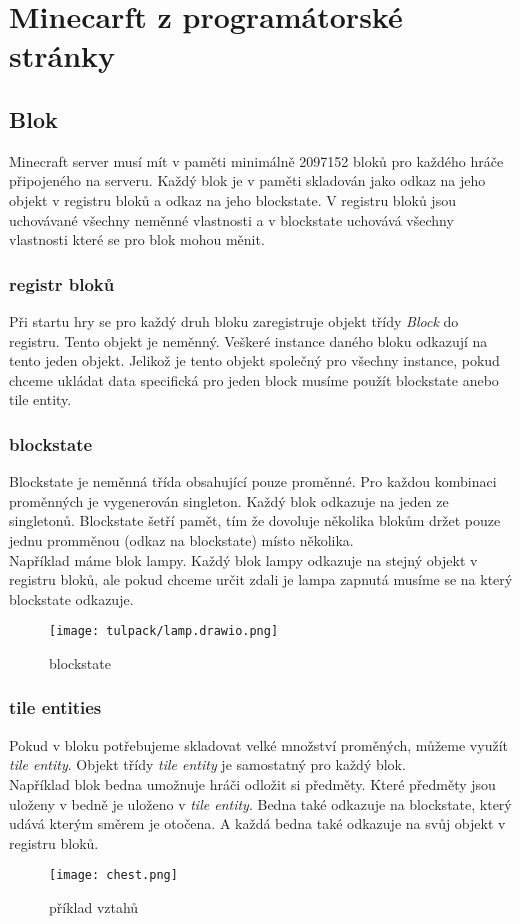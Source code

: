 \documentclass[FM,RP]{tulthesis}
\begin{document}
\chapter{Minecarft z programátorské stránky}
\section{Blok}
Minecraft server musí mít v paměti minimálně 2097152 bloků pro každého hráče připojeného na serveru. Každý blok je v paměti skladován jako odkaz na jeho objekt v registru bloků a odkaz na jeho blockstate. V registru bloků jsou uchovávané všechny neměnné vlastnosti a v blockstate uchovává všechny vlastnosti které se pro blok mohou měnit. 
\subsection{registr bloků}
Při startu hry se pro každý druh bloku zaregistruje objekt třídy \textit{Block} do registru. Tento objekt je neměnný. Veškeré instance daného bloku odkazují na tento jeden objekt. Jelikož je tento objekt společný pro všechny instance, pokud chceme ukládat data
specifická pro jeden block musíme použít blockstate anebo tile entity.
\subsection{blockstate}
Blockstate je neměnná třída obsahující pouze proměnné. Pro každou kombinaci proměnných je vygenerován singleton. Každý blok odkazuje na jeden ze singletonů. Blockstate šetří pamět, tím že dovoluje několika blokům držet pouze jednu promměnou (odkaz na blockstate) místo několika. \\Například máme blok lampy. Každý blok lampy odkazuje na stejný objekt v registru bloků, ale pokud chceme určit zdali je lampa zapnutá musíme se na který blockstate odkazuje.

\begin{figure}[h]
    \centering
    \texttt{[image: tulpack/lamp.drawio.png]}
    \caption{blockstate}
    \label{fig:blockstate}
\end{figure}

\subsection{tile entities}
Pokud v bloku potřebujeme skladovat velké množství proměných, můžeme využít \textit{tile entity}. Objekt třídy \textit{tile entity} je samostatný pro každý blok.\\
Například blok bedna umožnuje hráči odložit si předměty. Které předměty jsou uloženy v bedně je uloženo v \textit{tile entity}. Bedna také odkazuje na blockstate, který udává kterým směrem je otočena. A každá bedna také odkazuje na svůj objekt v registru bloků. 
\begin{figure}[h]
    \centering
    \texttt{[image: chest.png]}
    \caption{příklad vztahů}
    \label{fig:enter-label}
\end{figure}
\end{document}
